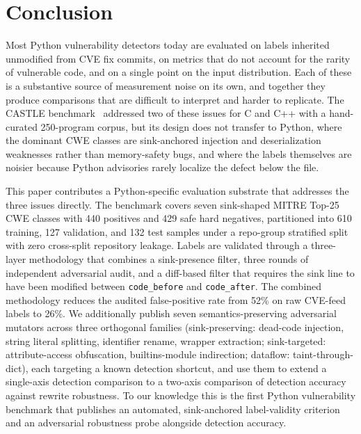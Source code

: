 \section{Conclusion}
\label{sec:conclusion}

Most Python vulnerability detectors today are evaluated on labels
inherited unmodified from CVE fix commits, on metrics that do not
account for the rarity of vulnerable code, and on a single point on
the input distribution. Each of these is a substantive source of
measurement noise on its own, and together they produce comparisons
that are difficult to interpret and harder to replicate. The CASTLE
benchmark~\cite{castle} addressed two of these issues for C and
C++ with a hand-curated 250-program corpus, but its design does not
transfer to Python, where the dominant CWE classes are sink-anchored
injection and deserialization weaknesses rather than memory-safety
bugs, and where the labels themselves are noisier because Python
advisories rarely localize the defect below the file.

This paper contributes a Python-specific evaluation substrate that
addresses the three issues directly. The benchmark covers seven
sink-shaped MITRE Top-25 CWE classes with 440 positives and 429 safe
hard negatives, partitioned into 610 training, 127 validation, and
132 test samples under a repo-group stratified split with zero
cross-split repository leakage. Labels are validated through a
three-layer methodology that combines a sink-presence filter, three
rounds of independent adversarial audit, and a diff-based filter that
requires the sink line to have been modified between
\texttt{code\_before} and \texttt{code\_after}. The combined
methodology reduces the audited false-positive rate from 52\% on raw
CVE-feed labels to 26\%. We additionally publish seven
semantics-preserving adversarial mutators across three orthogonal
families (sink-preserving: dead-code injection, string literal
splitting, identifier rename, wrapper extraction; sink-targeted:
attribute-access obfuscation, builtins-module indirection; dataflow:
taint-through-dict), each targeting a known detection shortcut, and
use them to extend a single-axis detection comparison to a two-axis
comparison of detection accuracy against rewrite robustness. To our knowledge this is the
first Python vulnerability benchmark that publishes an automated,
sink-anchored label-validity criterion and an adversarial robustness
probe alongside detection accuracy.

